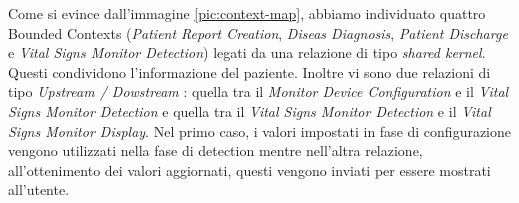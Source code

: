 Come si evince dall'immagine \ref{pic:context-map}, abbiamo individuato quattro Bounded Contexts (\textit{Patient Report Creation}, \textit{Diseas Diagnosis}, \textit{Patient Discharge} e \textit{Vital Signs Monitor Detection}) legati da una relazione di tipo \textit{shared kernel}. Questi condividono l'informazione del paziente. \newline \newline  Inoltre vi sono due relazioni di tipo \textit{Upstream / Dowstream} : quella tra il \textit{Monitor Device Configuration} e il \textit{Vital Signs Monitor Detection} e quella tra il \textit{Vital Signs Monitor Detection} e il \textit{Vital Signs Monitor Display}. Nel primo caso, i valori impostati in fase di configurazione vengono utilizzati nella fase di detection mentre nell'altra relazione, all'ottenimento dei valori aggiornati, questi vengono inviati per essere mostrati all'utente.